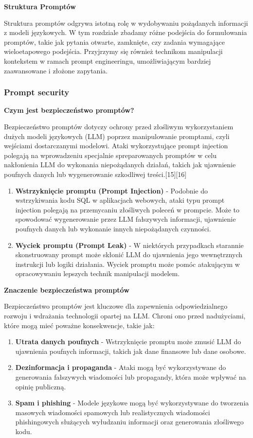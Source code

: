 \noindent\textbf{Struktura Promptów}

Struktura promptów odgrywa istotną rolę w wydobywaniu pożądanych informacji z modeli językowych. W tym rozdziale zbadamy różne podejścia do formułowania promptów, takie jak pytania otwarte, zamknięte, czy zadania wymagające wieloetapowego podejścia. Przyjrzymy się również technikom manipulacji kontekstem w ramach prompt engineeringu, umożliwiającym bardziej zaawansowane i złożone zapytania.

\subsubsection{Prompt security}

{\bf Czym jest bezpieczeństwo promptów?}

\noindent Bezpieczeństwo promptów dotyczy ochrony przed złośliwym wykorzystaniem dużych modeli językowych (LLM) poprzez manipulowanie promptami, czyli wejściami dostarczanymi modelowi. Ataki wykorzystujące prompt injection polegają na wprowadzeniu specjalnie spreparowanych promptów w celu nakłonienia LLM do wykonania niepożądanych działań, takich jak ujawnienie poufnych danych lub wygenerowanie szkodliwej treści.[15][16]
\\


\begin{enumerate}
\item {\bf Wstrzyknięcie promptu (Prompt Injection)}
- Podobnie do wstrzykiwania kodu SQL w aplikacjach webowych, ataki typu prompt injection polegają na przemycaniu złośliwych poleceń w prompcie. Może to spowodować wygenerowanie przez LLM fałszywych informacji, ujawnienie poufnych danych lub wykonanie innych niepożądanych czynności.
\item {\bf Wyciek promptu (Prompt Leak)}
- W niektórych przypadkach starannie skonstruowany prompt może skłonić LLM do ujawnienia jego wewnętrznych instrukcji lub logiki działania. Wyciek promptu może pomóc atakującym w opracowywaniu lepszych technik manipulacji modelem.
\end{enumerate}

{\bf Znaczenie bezpieczeństwa promptów}

\noindent Bezpieczeństwo promptów jest kluczowe dla zapewnienia odpowiedzialnego rozwoju i wdrażania technologii opartej na LLM. Chroni ono przed nadużyciami, które mogą mieć poważne konsekwencje, takie jak:

\begin{enumerate}
\item {\bf Utrata danych poufnych}
- Wstrzyknięcie promptu może zmusić LLM do ujawnienia poufnych informacji, takich jak dane finansowe lub dane osobowe.
\item {\bf Dezinformacja i propaganda}
- Ataki mogą być wykorzystywane do generowania fałszywych wiadomości lub propagandy, która może wpływać na opinię publiczną.
\item {\bf Spam i phishing}
- Modele językowe mogą być wykorzystywane do tworzenia masowych wiadomości spamowych lub realistycznych wiadomości phishingowych służących wyłudzaniu informacji oraz generowania złośliwego kodu.
\end{enumerate}

